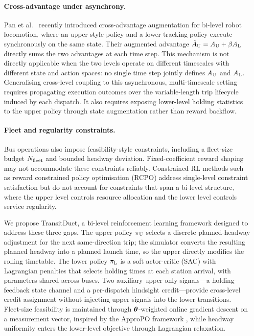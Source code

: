 \paragraph{Cross-advantage under asynchrony.}
Pan et al.~\citep{pan2024roboduet} recently introduced cross-advantage augmentation for bi-level robot locomotion, where an upper style policy and a lower tracking policy execute synchronously on the same state.
Their augmented advantage $\tilde{A}_{\mathrm{U}} = A_{\mathrm{U}} + \beta A_{\mathrm{L}}$ directly sums the two advantages at each time step.
This mechanism is not directly applicable when the two levels operate on different timescales with different state and action spaces: no single time step jointly defines $A_{\mathrm{U}}$ and $A_{\mathrm{L}}$.
Generalising cross-level coupling to this asynchronous, multi-timescale setting requires propagating execution outcomes over the variable-length trip lifecycle induced by each dispatch.
It also requires exposing lower-level holding statistics to the upper policy through state augmentation rather than reward backflow.

\paragraph{Fleet and regularity constraints.}
Bus operations also impose feasibility-style constraints, including a fleet-size budget $N_{\mathrm{fleet}}$ and bounded headway deviation.
Fixed-coefficient reward shaping may not accommodate these constraints reliably.
Constrained RL methods such as reward constrained policy optimisation (RCPO) \citep{tessler2019reward} address single-level constraint satisfaction but do not account for constraints that span a bi-level structure, where the upper level controls resource allocation and the lower level controls service regularity.

\medskip

We propose TransitDuet, a bi-level reinforcement learning framework designed to address these three gaps.
The upper policy $\pi_{\mathrm{U}}$ selects a discrete planned-headway adjustment for the next same-direction trip; the simulator converts the resulting planned headway into a planned launch time, so the upper directly modifies the rolling timetable. The lower policy $\pi_{\mathrm{L}}$ is a soft actor-critic (SAC) with Lagrangian penalties \citep{haarnoja2018soft} that selects holding times at each station arrival, with parameters shared across buses.
Two auxiliary upper-only signals---a holding-feedback state channel and a per-dispatch hindsight credit---provide cross-level credit assignment without injecting upper signals into the lower transitions.
Fleet-size feasibility is maintained through $\boldsymbol{\theta}$-weighted online gradient descent on a measurement vector, inspired by the ApproPO framework \citep{miryoosefi2019reinforcement}, while headway uniformity enters the lower-level objective through Lagrangian relaxation.

